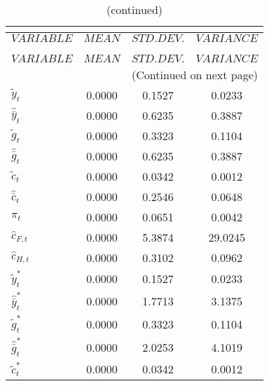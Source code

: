  
\begin{center}
\begin{longtable}{lccc} 
\caption{THEORETICAL MOMENTS}\\
 \label{Table:th_moments}\\
\toprule 
$VARIABLE             $	 & 	 $         MEAN$	 & 	 $    STD. DEV.$	 & 	 $     VARIANCE$\\
\midrule \endfirsthead 
\caption{(continued)}\\
 \toprule \\ 
$VARIABLE             $	 & 	 $         MEAN$	 & 	 $    STD. DEV.$	 & 	 $     VARIANCE$\\
\midrule \endhead 
\midrule \multicolumn{4}{r}{(Continued on next page)} \\ \bottomrule \endfoot 
\bottomrule \endlastfoot 
${\tilde y_t}         $	 & 	       0.0000	 & 	       0.1527	 & 	       0.0233 \\ 
${\hat {\bar y}_t}    $	 & 	       0.0000	 & 	       0.6235	 & 	       0.3887 \\ 
${\tilde g_t}         $	 & 	       0.0000	 & 	       0.3323	 & 	       0.1104 \\ 
${\hat {\bar g}_t}    $	 & 	       0.0000	 & 	       0.6235	 & 	       0.3887 \\ 
${\tilde c_t}         $	 & 	       0.0000	 & 	       0.0342	 & 	       0.0012 \\ 
${\hat {\bar c}_t}    $	 & 	       0.0000	 & 	       0.2546	 & 	       0.0648 \\ 
${\pi_t}              $	 & 	       0.0000	 & 	       0.0651	 & 	       0.0042 \\ 
${\hat c_{F,t}}       $	 & 	       0.0000	 & 	       5.3874	 & 	      29.0245 \\ 
${\hat c_{H,t}}       $	 & 	       0.0000	 & 	       0.3102	 & 	       0.0962 \\ 
${\tilde y_t^*}       $	 & 	       0.0000	 & 	       0.1527	 & 	       0.0233 \\ 
${\hat {\bar y}_t^*}  $	 & 	       0.0000	 & 	       1.7713	 & 	       3.1375 \\ 
${\tilde g_t^*}       $	 & 	       0.0000	 & 	       0.3323	 & 	       0.1104 \\ 
${\hat {\bar g}_t^*}  $	 & 	       0.0000	 & 	       2.0253	 & 	       4.1019 \\ 
${\tilde c_t^*}       $	 & 	       0.0000	 & 	       0.0342	 & 	       0.0012 \\ 

\end{longtable}
\end{center}
